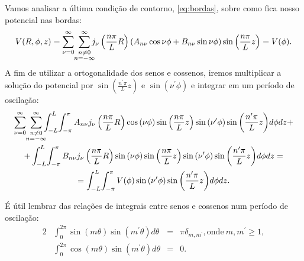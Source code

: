 \documentclass{article}
\begin{document}
Vamos analisar a última condição de contorno, \eqref{eq:bordas}, sobre como fica nosso potencial nas bordas:
\begin{equation}
 V(R,\phi,z) = \sum_{\nu = 0}^{\infty} \ \sum_{\mathclap{\substack{n \neq 0 \\ n = -\infty}}}^{\infty} j_{\nu}\left( \frac{n \pi}{L} R \right)
 (A_{n \nu} \cos{\nu \phi} + B_{n \nu} \sin{\nu \phi}) \sin{\left( \frac{n \pi}{L}z \right)} = V(\phi)\mathrm{.}
\end{equation}
A fim de utilizar a ortogonalidade dos senos e cossenos, iremos multiplicar a solução do potencial por $\sin{\left( \frac{n^{\prime} \pi}{L}z \right)}$ e
$\sin{(\nu^{\prime}\phi)}$ e integrar em um período de oscilação:
\begin{multline}
 \sum_{\nu = 0}^{\infty} \ \sum_{\mathclap{\substack{n \neq 0 \\ n = -\infty}}}^{\infty}
 \int_{-L}^{L} \! \int_{-\pi}^{\pi}
 A_{n \nu} j_{\nu}\left( \frac{n \pi}{L} R \right) \cos{(\nu \phi)} \sin{\left( \frac{n \pi}{L}z \right)} \sin{(\nu^{\prime} \phi)}
 \sin{\left( \frac{n^{\prime} \pi}{L}z \right)} d\phi dz+ \\
 + \int_{-L}^{L} \!  \int_{-\pi}^{\pi}
 B_{n \nu} j_{\nu}\left( \frac{n \pi}{L} R \right) \sin{(\nu \phi)} \sin{\left( \frac{n \pi}{L}z \right)} \sin{(\nu^{\prime} \phi)}
 \sin{\left( \frac{n^{\prime} \pi}{L}z \right)} d\phi dz = \\
 = \int_{-L}^{L} \!  \int_{-\pi}^{\pi}
 V(\phi) \sin{(\nu^{\prime} \phi)} \sin{\left( \frac{n^{\prime} \pi}{L}z \right)} d\phi dz \mathrm{.}
\end{multline}

É útil lembrar das relações de integrais entre senos e cossenos num período de oscilação:
\begin{alignat}{2}
 &\int_{0}^{2 \pi} \sin{(m \theta)} \sin{(m^{\prime}\theta)} d\theta &=& \pi \delta_{m,m^{\prime}}, \mathrm{onde\ }m, m^{\prime} \geq 1 \mathrm{,}\\
 &\int_{0}^{2 \pi} \cos{(m \theta)} \sin{(m^{\prime}\theta)} d\theta &=& 0\mathrm{.}
\end{alignat}
\end{document}
